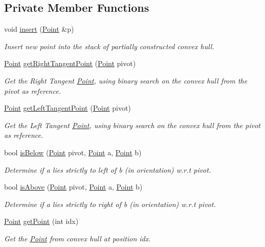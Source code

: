 \subsection*{Private Member Functions}
\begin{DoxyCompactItemize}
\item 
void \mbox{\hyperlink{classGrahamScan_a4996cb0d2deb3cd6f9cb3df99b91e7e8}{insert}} (\mbox{\hyperlink{classPoint}{Point}} \&p)
\begin{DoxyCompactList}\small\item\em Insert new point into the stack of partially constructed convex hull. \end{DoxyCompactList}\item 
\mbox{\hyperlink{classPoint}{Point}} \mbox{\hyperlink{classGrahamScan_ae01e3fe104346f991f951a6843a15893}{get\+Right\+Tangent\+Point}} (\mbox{\hyperlink{classPoint}{Point}} pivot)
\begin{DoxyCompactList}\small\item\em Get the Right Tangent \mbox{\hyperlink{classPoint}{Point}}, using binary search on the convex hull from the pivot as reference. \end{DoxyCompactList}\item 
\mbox{\hyperlink{classPoint}{Point}} \mbox{\hyperlink{classGrahamScan_a25068b534491cef265e5d7c038f82e7d}{get\+Left\+Tangent\+Point}} (\mbox{\hyperlink{classPoint}{Point}} pivot)
\begin{DoxyCompactList}\small\item\em Get the Left Tangent \mbox{\hyperlink{classPoint}{Point}}, using binary search on the convex hull from the pivot as reference. \end{DoxyCompactList}\item 
bool \mbox{\hyperlink{classGrahamScan_aff60053b35be2c735b37dd88e079d460}{is\+Below}} (\mbox{\hyperlink{classPoint}{Point}} pivot, \mbox{\hyperlink{classPoint}{Point}} a, \mbox{\hyperlink{classPoint}{Point}} b)
\begin{DoxyCompactList}\small\item\em Determine if \textquotesingle{}a\textquotesingle{} lies strictly to left of \textquotesingle{}b\textquotesingle{} (in orientation) w.\+r.\+t pivot. \end{DoxyCompactList}\item 
bool \mbox{\hyperlink{classGrahamScan_ab860e33708a7cf494b0708c49a303c0c}{is\+Above}} (\mbox{\hyperlink{classPoint}{Point}} pivot, \mbox{\hyperlink{classPoint}{Point}} a, \mbox{\hyperlink{classPoint}{Point}} b)
\begin{DoxyCompactList}\small\item\em Determine if a lies strictly to right of b (in orientation) w.\+r.\+t pivot. \end{DoxyCompactList}\item 
\mbox{\hyperlink{classPoint}{Point}} \mbox{\hyperlink{classGrahamScan_a79b1642bc347f2f6e517b2f3415e871d}{get\+Point}} (int idx)
\begin{DoxyCompactList}\small\item\em Get the \mbox{\hyperlink{classPoint}{Point}} from convex hull at position \textquotesingle{}idx\textquotesingle{}. \end{DoxyCompactList}\end{DoxyCompactItemize}
